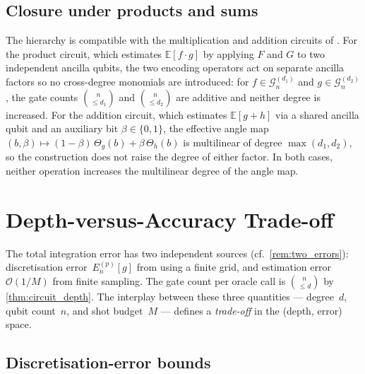\documentclass[12pt,a4paper]{article}
\theoremstyle{plain}
\theoremstyle{definition}
\theoremstyle{remark}
\newcommand{\Gclass}[2]{\mathcal{G}_{#1}^{(#2)}}
\newcommand{\Thetag}{\Theta_g}
\begin{document}
\subsection{Closure under products and sums}

The hierarchy is compatible with the multiplication and addition
circuits of \cite[Sec.~III]{CarreraVazquezWoerner2020}.
For the product circuit, which estimates $\mathbb{E}[f\cdot g]$ by
applying $F$ and $G$ to two independent ancilla qubits, the two
encoding operators act on separate ancilla factors so no cross-degree
monomials are introduced: for $f\in\Gclass{n}{d_1}$ and
$g\in\Gclass{n}{d_2}$, the gate counts $\binom{n}{\leq d_1}$ and
$\binom{n}{\leq d_2}$ are additive and neither degree is increased.
For the addition circuit, which estimates $\mathbb{E}[g+h]$ via a
shared ancilla qubit and an auxiliary bit $\beta\in\{0,1\}$, the
effective angle map $(b,\beta)\mapsto(1-\beta)\,\Thetag(b)+\beta\,\Theta_h(b)$
is multilinear of degree $\max(d_1,d_2)$, so the construction does not
raise the degree of either factor.
In both cases, neither operation increases the multilinear degree of
the angle map.

\section{Depth-versus-Accuracy Trade-off}
\label{sec:pareto}

The total integration error has two independent sources
(cf.\ \cref{rem:two_errors}): discretisation error~$E_n^{(p)}[g]$
from using a finite grid, and estimation error $\mathcal{O}(1/M)$ from
finite sampling.
The gate count per oracle call is $\binom{n}{\leq d}$ by
\cref{thm:circuit_depth}.
The interplay between these three quantities — degree~$d$, qubit
count~$n$, and shot budget~$M$ — defines a
\emph{trade-off} in the (depth, error) space.

\subsection{Discretisation-error bounds}
\end{document}
